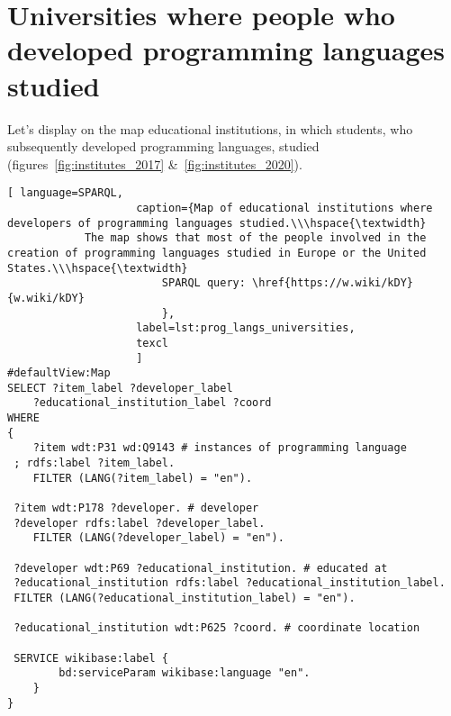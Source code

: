 \section{Universities where people who developed programming languages studied}
Let's display on the map educational institutions, in which students, who subsequently developed programming languages, studied (figures~\ref{fig:institutes_2017} \&~\ref{fig:institutes_2020}).
\newpage
{}
\begin{lstlisting}[ language=SPARQL, 
                    caption={Map of educational institutions where developers of programming languages studied.\\\hspace{\textwidth}
			The map shows that most of the people involved in the creation of programming languages studied in Europe or the United States.\\\hspace{\textwidth}
                        SPARQL query: \href{https://w.wiki/kDY}{w.wiki/kDY}
                        },
                    label=lst:prog_langs_universities,
                    texcl 
                    ]
#defaultView:Map
SELECT ?item_label ?developer_label 
	?educational_institution_label ?coord
WHERE
{
 	?item wdt:P31 wd:Q9143 # instances of programming language
 ; rdfs:label ?item_label. 
 	FILTER (LANG(?item_label) = "en"). 
 
 ?item wdt:P178 ?developer. # developer
 ?developer rdfs:label ?developer_label. 
 	FILTER (LANG(?developer_label) = "en"). 
 		
 ?developer wdt:P69 ?educational_institution. # educated at
 ?educational_institution rdfs:label ?educational_institution_label. 
 FILTER (LANG(?educational_institution_label) = "en").
 
 ?educational_institution wdt:P625 ?coord. # coordinate location

 SERVICE wikibase:label {
		bd:serviceParam wikibase:language "en".
	} 	
}
\end{lstlisting}%

\label{question:prog_lang_3}

